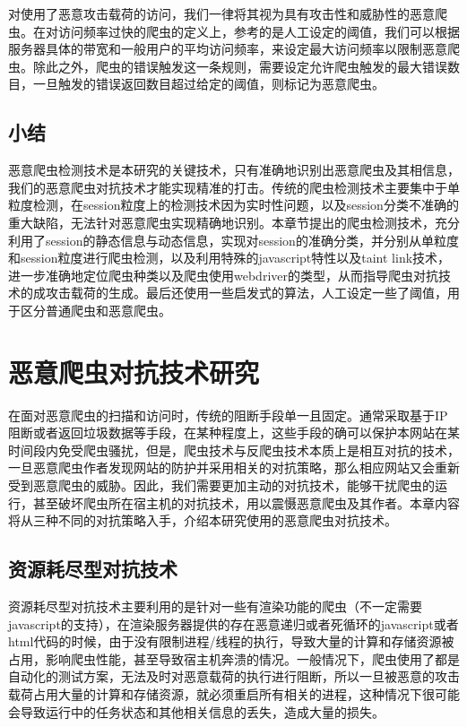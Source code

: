 \documentclass[doctor,privacy,twoside]{buaa_mac}
\begin{document}
对使用了恶意攻击载荷的访问，我们一律将其视为具有攻击性和威胁性的恶意爬虫。在对访问频率过快的爬虫的定义上，参考的是人工设定的阈值，我们可以根据服务器具体的带宽和一般用户的平均访问频率，来设定最大访问频率以限制恶意爬虫。除此之外，爬虫的错误触发这一条规则，需要设定允许爬虫触发的最大错误数目，一旦触发的错误返回数目超过给定的阈值，则标记为恶意爬虫。


\section{小结}
恶意爬虫检测技术是本研究的关键技术，只有准确地识别出恶意爬虫及其相信息，我们的恶意爬虫对抗技术才能实现精准的打击。传统的爬虫检测技术主要集中于单粒度检测，在session粒度上的检测技术因为实时性问题，以及session分类不准确的重大缺陷，无法针对恶意爬虫实现精确地识别。本章节提出的爬虫检测技术，充分利用了session的静态信息与动态信息，实现对session的准确分类，并分别从单粒度和session粒度进行爬虫检测，以及利用特殊的javascript特性以及taint link技术，进一步准确地定位爬虫种类以及爬虫使用webdriver的类型，从而指导爬虫对抗技术的成攻击载荷的生成。最后还使用一些启发式的算法，人工设定一些了阈值，用于区分普通爬虫和恶意爬虫。


\chapter{恶意爬虫对抗技术研究}

在面对恶意爬虫的扫描和访问时，传统的阻断手段单一且固定。通常采取基于IP阻断或者返回垃圾数据等手段，在某种程度上，这些手段的确可以保护本网站在某时间段内免受爬虫骚扰，但是，爬虫技术与反爬虫技术本质上是相互对抗的技术，一旦恶意爬虫作者发现网站的防护并采用相关的对抗策略，那么相应网站又会重新受到恶意爬虫的威胁。因此，我们需要更加主动的对抗技术，能够干扰爬虫的运行，甚至破坏爬虫所在宿主机的对抗技术，用以震慑恶意爬虫及其作者。本章内容将从三种不同的对抗策略入手，介绍本研究使用的恶意爬虫对抗技术。

\section{资源耗尽型对抗技术}
资源耗尽型对抗技术主要利用的是针对一些有渲染功能的爬虫（不一定需要javascript的支持），在渲染服务器提供的存在恶意递归或者死循环的javascript或者html代码的时候，由于没有限制进程/线程的执行，导致大量的计算和存储资源被占用，影响爬虫性能，甚至导致宿主机奔溃的情况。一般情况下，爬虫使用了都是自动化的测试方案，无法及时对恶意载荷的执行进行阻断，所以一旦被恶意的攻击载荷占用大量的计算和存储资源，就必须重启所有相关的进程，这种情况下很可能会导致运行中的任务状态和其他相关信息的丢失，造成大量的损失。
\end{document}
